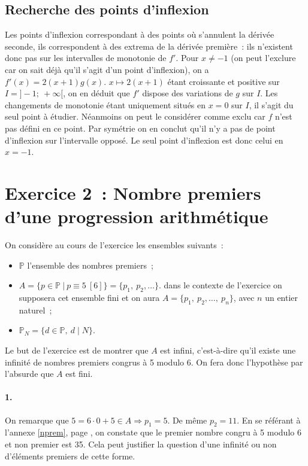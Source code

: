 \documentclass{article}
\begin{document}
  \subsection*{Recherche des points d'inflexion}
  Les points d'inflexion correspondant à des points où s'annulent la dérivée seconde, ils correspondent à des extrema de la dérivée première~: ils n'existent donc pas sur les intervalles de monotonie de $f'$. Pour $x \neq -1$ (on peut l'exclure car on sait déjà qu'il s'agit d'un point d'inflexion), on a $f'(x)=2(x + 1)g(x)$. $x\mapsto 2(x + 1)$ étant croissante et positive sur $I = ]-1;\ +\infty[$, on en déduit que $f'$ dispose des variations de $g$ sur $I$. Les changements de monotonie étant uniquement situés en $x = 0$ sur $I$, il s'agit du seul point à étudier. Néanmoins on peut le considérer comme exclu car $f$ n'est pas défini en ce point. Par symétrie on en conclut qu'il n'y a pas de point d'inflexion sur l'intervalle opposé. Le seul point d'inflexion est donc celui en $x = -1$.

  \section*{Exercice 2~: Nombre premiers d'une progression arithmétique}
  On considère au cours de l'exercice les ensembles suivants~:
  \begin{itemize}
    \item $\mathbb{P}$ l'ensemble des nombres premiers~;
    \item $A = \{p\in\mathbb{P}\ |\ p \equiv 5 \ [6]\} = \{p_1,\ p_2,\ldots\}$. dans le contexte de l'exercice on supposera cet ensemble fini et on aura $A = \{p_1,\ p_2,\ldots,\ p_n\}$, avec $n$ un entier naturel~;
    \item $\mathbb{P}_N = \{ d\in\mathbb{P},\ d \mid N\}$.
  \end{itemize}
  Le but de l'exercice est de montrer que $A$ est infini, c'est-à-dire qu'il existe une infinité de nombres premiers congrus à 5 modulo 6. On fera donc l'hypothèse par l'absurde que $A$ est fini.

  \paragraph{1.} On remarque que $5 = 6 \cdot 0 + 5\in A \Rightarrow p_1 = 5$. De même $p_2 = 11$. En se référant à l'annexe \ref{nprem}, page \pageref{nprem}, on constate que le premier nombre congru à 5 modulo 6 et non premier est 35. Cela peut justifier la question d'une infinité ou non d'éléments premiers de cette forme.
\end{document}
